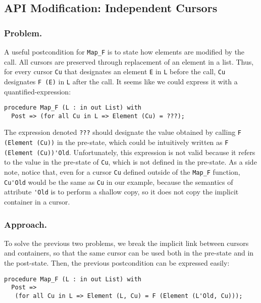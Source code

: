 \documentclass[runningheads,a4paper]{llncs}
\newcommand{\beforesub}{\vspace{-0.2cm}}
\newcommand{\aftersub}{\vspace{-0.1cm}}
\begin{document}
\beforesub
\subsection{API Modification: Independent Cursors}
\label{sec:independent-cursor}
\aftersub

\subsubsection{Problem.}

A useful postcondition for \verb|Map_F| is to state how elements are
modified by the call. All cursors are preserved through replacement of an
element in a list. Thus, for every cursor \verb|Cu| that designates an element
\verb|E| in \verb|L| before the call, \verb|Cu| designates \verb|F (E)| in
\verb|L| after the call. It seems like we could express it with a
quantified-expression:
\begin{verbatim}
procedure Map_F (L : in out List) with 
  Post => (for all Cu in L => Element (Cu) = ???);
\end{verbatim}

The expression denoted \verb|???| should designate the value obtained by calling
\verb|F (Element (Cu))| in the pre-state, which could be intuitively written as
\verb|F (Element (Cu))'Old|. Unfortunately, this expression is not valid
because it refers to the value in the pre-state of \verb|Cu|, which is not
defined in the pre-state. As a side note, notice that, even for a cursor
\verb|Cu| defined outside of the \verb|Map_F| function, \verb|Cu'Old| would be the same as
\verb|Cu| in our example, because the semantics of attribute \verb|'Old| is to
perform a shallow copy, so it does not copy the implicit container in a cursor.


\subsubsection{Approach.}
To solve the previous two problems,
we break the implicit link between cursors and containers, so that the same cursor can be used both in
the pre-state and in the post-state. Then, the previous postcondition can be
expressed easily:
\begin{verbatim}
procedure Map_F (L : in out List) with 
  Post => 
   (for all Cu in L => Element (L, Cu) = F (Element (L'Old, Cu)));
\end{verbatim}
\end{document}
